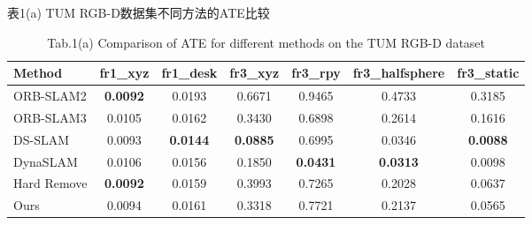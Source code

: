 \begin{table}[htbp]
\centering
\caption{表1(a) TUM RGB-D数据集不同方法的ATE比较}
\caption*{Tab.1(a) Comparison of ATE for different methods on the TUM RGB-D dataset}
\label{tab:tum_ate}
\begin{tabular}{lcccccc}
\toprule
Method & fr1\_xyz & fr1\_desk & fr3\_xyz & fr3\_rpy & fr3\_halfsphere & fr3\_static \\
\midrule
ORB-SLAM2 & \textbf{0.0092} & 0.0193 & 0.6671 & 0.9465 & 0.4733 & 0.3185 \\
ORB-SLAM3 & 0.0105 & 0.0162 & 0.3430 & 0.6898 & 0.2614 & 0.1616 \\
DS-SLAM & 0.0093 & \textbf{0.0144} & \textbf{0.0885} & 0.6995 & 0.0346 & \textbf{0.0088} \\
DynaSLAM & 0.0106 & 0.0156 & 0.1850 & \textbf{0.0431} & \textbf{0.0313} & 0.0098 \\
Hard Remove & \textbf{0.0092} & 0.0159 & 0.3993 & 0.7265 & 0.2028 & 0.0637 \\
Ours & 0.0094 & 0.0161 & 0.3318 & 0.7721 & 0.2137 & 0.0565 \\
\bottomrule
\end{tabular}
\end{table}

